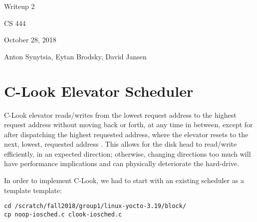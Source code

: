 \documentclass[onecolumn, draftclsnofoot, 10pt, compsoc]{../ThirdParty/IEEEtran}
\begin{document}
\begin{titlepage}
\begin{singlespace}
\centering
\scshape{
    \huge{Writeup 2}\par
    \vspace{.5in}
    \large{CS 444}\par
    \large{October 28, 2018}\par
    \vspace{.5in}
    \large{Anton Synytsia, Eytan Brodsky, David Jansen}\par
    \vspace{.5in}
    \vfill
}
\end{singlespace}
\end{titlepage}
\newpage
{}
\tableofcontents
\clearpage

\section{C-Look Elevator Scheduler}
C-Look elevator reads/writes from the lowest request address to the highest request address without moving back or forth, at any time in between, except for after dispatching the highest requested address, where the elevator resets to the next, lowest, requested address \cite{clook}. This allows for the disk head to read/write efficiently, in an expected direction; otherwise, changing directions too much will have performance implications and can physically deteriorate the hard-drive.

In order to implement C-Look, we had to start with an existing scheduler as a template template:
\begin{verbatim}
cd /scratch/fall2018/group1/linux-yocto-3.19/block/
cp noop-iosched.c clook-iosched.c
\end{verbatim}
\end{document}
